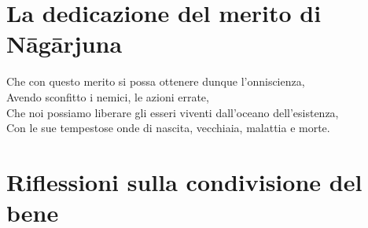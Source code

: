 \section{La dedicazione del merito di Nāgārjuna}
\vspace*{-1em}\noindent{}

Che con questo merito si possa ottenere dunque l'onniscienza, \\
Avendo sconfitto i nemici, le azioni errate, \\
Che noi possiamo liberare gli esseri viventi dall'oceano dell'esistenza, \\
Con le sue tempestose onde di nascita, vecchiaia, malattia e morte.

\section{Riflessioni sulla condivisione del bene}
\vspace*{-1em}\noindent{}

